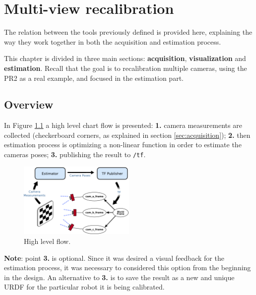 \chapter{Multi-view recalibration}
\label{cha:multi-view calibration}

\vspace*{-3ex}
The relation between the tools previously defined is provided here, explaining the way they work together in both the acquisition and estimation process.

This chapter is divided in three main sections: \textbf{acquisition}, \textbf{visualization} and \textbf{estimation}. Recall that the goal is to recalibration multiple cameras, using the PR2 as a real example, and focused in the estimation part.

\section{Overview}
\label{sec:estimation_overview}

In Figure \ref{fig:high_level_flow} a high level chart flow is presented: \textbf{1.} camera measurements are collected (checkerboard corners, as explained in section \ref{sec:acquisition}); \textbf{2.} then estimation process is optimizing a non-linear function in order to estimate the cameras poses; \textbf{3.} publishing the result to \texttt{/tf}.

\begin{figure}[!htbp]
 \centering
 \includegraphics[width=0.5\textwidth]{images/high_level_flow_02.png}
 \caption{High level flow.}
 \label{fig:high_level_flow}
\end{figure}

\noindent
\textbf{Note}: point \textbf{3.} is optional. Since it was desired a visual feedback for the estimation process, it was necessary to considered this option from the beginning in the design. An alternative to \textbf{3.} is to save the result as a new and unique URDF for the particular robot it is being calibrated.



